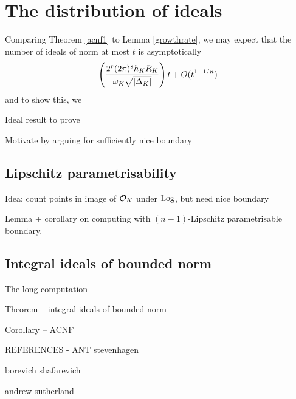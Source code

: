 \documentclass[11pt]{report}
\begin{document}
\section{The distribution of ideals}
Comparing Theorem \ref{acnf1} to Lemma \ref{growthrate}, we may expect that the number of ideals of norm at most $t$ is asymptotically
$$
    \left(  \frac{2^r(2\pi)^sh_KR_K}{\omega_K\sqrt{\left| \Delta_K \right|}}  \right)t + O(t^{1 - 1/n})
$$
and to show this, we 

Ideal result to prove

Motivate by arguing for sufficiently nice boundary
\subsection{Lipschitz parametrisability}
Idea: count points in image of $\mathcal{O}_K$ under $\operatorname{Log}$, but need nice boundary

Lemma + corollary on computing with $(n - 1)$-Lipschitz parametrisable boundary.

\subsection{Integral ideals of bounded norm}
The long computation


Theorem -- integral ideals of bounded norm

Corollary -- ACNF


REFERENCES - ANT stevenhagen

borevich shafarevich

andrew sutherland
\end{document}
